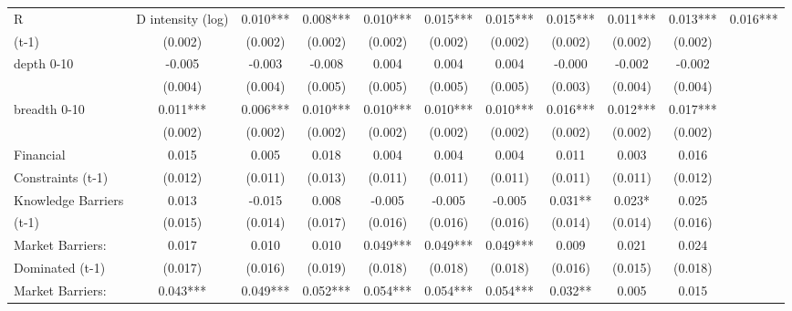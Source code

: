 \begin{table}[htbp]
\begin{tabular}{l*{9}{c}}
R&D intensity (log) &       0.010***&       0.008***&       0.010***&       0.015***&       0.015***&       0.015***&       0.011***&       0.013***&       0.016***\\
(t-1)               &     (0.002)   &     (0.002)   &     (0.002)   &     (0.002)   &     (0.002)   &     (0.002)   &     (0.002)   &     (0.002)   &     (0.002)   \\
depth 0-10          &      -0.005   &      -0.003   &      -0.008   &       0.004   &       0.004   &       0.004   &      -0.000   &      -0.002   &      -0.002   \\
                    &     (0.004)   &     (0.004)   &     (0.005)   &     (0.005)   &     (0.005)   &     (0.005)   &     (0.003)   &     (0.004)   &     (0.004)   \\
breadth 0-10        &       0.011***&       0.006***&       0.010***&       0.010***&       0.010***&       0.010***&       0.016***&       0.012***&       0.017***\\
                    &     (0.002)   &     (0.002)   &     (0.002)   &     (0.002)   &     (0.002)   &     (0.002)   &     (0.002)   &     (0.002)   &     (0.002)   \\
Financial           &       0.015   &       0.005   &       0.018   &       0.004   &       0.004   &       0.004   &       0.011   &       0.003   &       0.016   \\
Constraints (t-1)   &     (0.012)   &     (0.011)   &     (0.013)   &     (0.011)   &     (0.011)   &     (0.011)   &     (0.011)   &     (0.011)   &     (0.012)   \\
Knowledge Barriers  &       0.013   &      -0.015   &       0.008   &      -0.005   &      -0.005   &      -0.005   &       0.031** &       0.023*  &       0.025   \\
(t-1)               &     (0.015)   &     (0.014)   &     (0.017)   &     (0.016)   &     (0.016)   &     (0.016)   &     (0.014)   &     (0.014)   &     (0.016)   \\
Market Barriers:    &       0.017   &       0.010   &       0.010   &       0.049***&       0.049***&       0.049***&       0.009   &       0.021   &       0.024   \\
Dominated (t-1)     &     (0.017)   &     (0.016)   &     (0.019)   &     (0.018)   &     (0.018)   &     (0.018)   &     (0.016)   &     (0.015)   &     (0.018)   \\
Market Barriers:    &       0.043***&       0.049***&       0.052***&       0.054***&       0.054***&       0.054***&       0.032** &       0.005   &       0.015   \\

\end{tabular}
\end{table}
